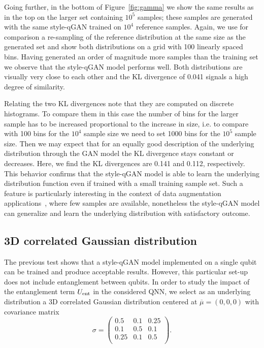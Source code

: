 \documentclass[twocolumn,preprintnumbers,superscriptaddress]{revtex4-2}
\begin{document}
Going further, in the bottom of Figure~\ref{fig:gamma} we show the same results as in the top on the larger set containing $10^5$ samples; these samples are generated with the same style-qGAN trained on $10^4$ reference samples. Again, we use for comparison a re-sampling of the reference distribution at the same size as the generated set and show both distributions on a grid with 100 linearly spaced bins. 
%
Having generated an order of magnitude more samples than the training set we observe that the style-qGAN model performs well. Both distributions are visually very close to each other and the KL divergence of 0.041 signals a high degree of similarity. 

Relating the two KL divergences note that they are computed on discrete histograms. To compare them in this case the number of bins for the larger sample has to be increased proportional to the increase in size, i.e. to compare with 100 bins for the $10^4$ sample size we need to set 1000 bins for the $10^5$ sample size. Then we may expect that for an equally good description of the underlying distribution through the GAN model the KL divergence stays constant or decreases.
Here, we find the KL divergences are 0.141 and 0.112, respectively. 
%
This behavior confirms that the style-qGAN model is able to learn the underlying
distribution function even if trained with a small training sample set. Such a
feature is particularly interesting in the context of data augmentation
applications~\cite{frid2018synthetic,tanaka2019data}, where few samples are
available, nonetheless the style-qGAN model can generalize and learn the underlying distribution
with satisfactory outcome.

\subsection{3D correlated Gaussian distribution}

The previous test shows that a style-qGAN model implemented on a single qubit can be
trained and produce acceptable results. However, this particular set-up does not
include entanglement between qubits. In order to study the impact of the
entanglement term $U_{\rm ent}$ in the considered QNN, we select as an
underlying distribution a 3D correlated Gaussian distribution centered at
$\overline{\mu}=(0,0,0)$ with covariance matrix
\begin{equation}
\label{eq:covmat}
  \sigma =
\begin{pmatrix}
  0.5 & 0.1 & 0.25\\
  0.1 & 0.5 & 0.1\\
  0.25 & 0.1 & 0.5\\
  \end{pmatrix}.
\end{equation}
\end{document}
